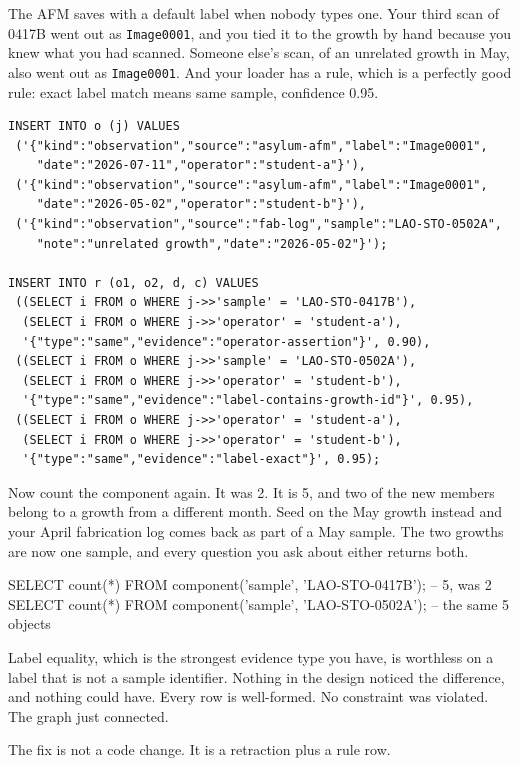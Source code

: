The AFM saves with a default label when nobody types one. Your third scan of 0417B went out as \texttt{Image0001}, and you tied it to the growth by hand because you knew what you had scanned. Someone else's scan, of an unrelated growth in May, also went out as \texttt{Image0001}. And your loader has a rule, which is a perfectly good rule: exact label match means same sample, confidence 0.95.

\begin{lstlisting}
INSERT INTO o (j) VALUES
 ('{"kind":"observation","source":"asylum-afm","label":"Image0001",
    "date":"2026-07-11","operator":"student-a"}'),
 ('{"kind":"observation","source":"asylum-afm","label":"Image0001",
    "date":"2026-05-02","operator":"student-b"}'),
 ('{"kind":"observation","source":"fab-log","sample":"LAO-STO-0502A",
    "note":"unrelated growth","date":"2026-05-02"}');

INSERT INTO r (o1, o2, d, c) VALUES
 ((SELECT i FROM o WHERE j->>'sample' = 'LAO-STO-0417B'),
  (SELECT i FROM o WHERE j->>'operator' = 'student-a'),
  '{"type":"same","evidence":"operator-assertion"}', 0.90),
 ((SELECT i FROM o WHERE j->>'sample' = 'LAO-STO-0502A'),
  (SELECT i FROM o WHERE j->>'operator' = 'student-b'),
  '{"type":"same","evidence":"label-contains-growth-id"}', 0.95),
 ((SELECT i FROM o WHERE j->>'operator' = 'student-a'),
  (SELECT i FROM o WHERE j->>'operator' = 'student-b'),
  '{"type":"same","evidence":"label-exact"}', 0.95);
\end{lstlisting}

Now count the component again. It was 2. It is 5, and two of the new members belong to a growth from a different month. Seed on the May growth instead and your April fabrication log comes back as part of a May sample. The two growths are now one sample, and every question you ask about either returns both.

\begin{Check}
SELECT count(*) FROM component('sample', 'LAO-STO-0417B');   -- 5, was 2
SELECT count(*) FROM component('sample', 'LAO-STO-0502A');   -- the same 5 objects
\end{Check}

Label equality, which is the strongest evidence type you have, is worthless on a label that is not a sample identifier. Nothing in the design noticed the difference, and nothing could have. Every row is well-formed. No constraint was violated. The graph just connected.

The fix is not a code change. It is a retraction plus a rule row.

